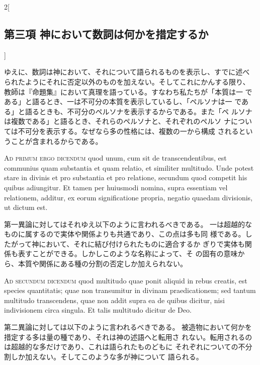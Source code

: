 \documentclass[paper=a4paper,fontsize=10pt,jafontsize=9pt,titlepage]{jlreq}
\begin{document}
\begin{paracol}{2}[\subsection{第三項 神において数詞は何かを措定するか}]
\switchcolumn


ゆえに、数詞は神において、それについて語られるものを表示し、すでに述べ
 られたようにそれに否定以外のものを加えない。そしてこれにかんする限り、
 教師は『命題集』において真理を語っている。すなわち私たちが「本質は一
 である」と語るとき、一は不可分の本質を表示しているし、「ペルソナは一
 である」と語るときも、不可分のペルソナを表示するからである。また「ペ
 ルソナは複数である」と語るとき、それらのペルソナと、それぞれのペルソ
 ナについては不可分を表示する。なぜなら多の性格には、複数の一から構成
 されるということが含まれるからである。


\switchcolumn*[\subsection{ad.1}]


{\scshape Ad primum ergo dicendum} quod unum, cum sit de transcendentibus, est
communius quam substantia et quam relatio, et similiter
multitudo. Unde potest stare in divinis et pro substantia et pro
relatione, secundum quod competit his quibus adiungitur. Et tamen per
huiusmodi nomina, supra essentiam vel relationem, additur, ex eorum
significatione propria, negatio quaedam divisionis, ut dictum est.


\switchcolumn


第一異論に対してはそれゆえ以下のように言われるべきである。
一は超越的なものに属するので実体や関係よりも共通であり、この点は多も同
 様である。したがって神において、それに結び付けられたものに適合するか
 ぎりで実体も関係も表すことができる。しかしこのような名称によって、そ
 の固有の意味から、本質や関係にある種の分割の否定しか加えられない。


\switchcolumn*[\subsection{ad.2}]


{\scshape Ad secundum dicendum} quod multitudo quae ponit aliquid in rebus
creatis, est species quantitatis; quae non transumitur in divinam
praedicationem; sed tantum multitudo transcendens, quae non addit
supra ea de quibus dicitur, nisi indivisionem circa singula. Et talis
multitudo dicitur de Deo.


\switchcolumn


第二異論に対しては以下のように言われるべきである。
被造物において何かを措定する多は量の種であり、それは神の述語へと転用さ
 れない。転用されるのは超越的な多だけであり、これは語られたものどもに
 それぞれについての不分割しか加えない。そしてこのような多が神について
 語られる。



\end{paracol}
\end{document}
